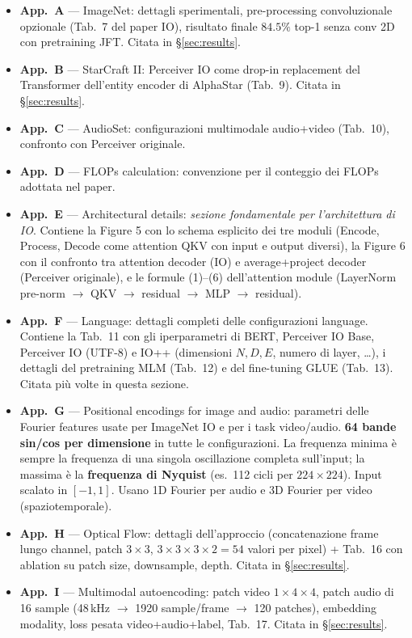 \documentclass[
  11pt,
]{article}
\begin{document}
\begin{notabox}[title={\textbf{Mappa delle appendici del paper Perceiver IO (Jaegle et al., 2022)}}]
\begin{itemize}\setlength\itemsep{0.1em}
\item \textbf{App.\ A} --- ImageNet: dettagli sperimentali, pre-processing convoluzionale opzionale (Tab.\ 7 del paper IO), risultato finale $84.5\%$ top-1 senza conv 2D con pretraining JFT. Citata in \S\ref{sec:results}.
\item \textbf{App.\ B} --- StarCraft II: Perceiver IO come drop-in replacement del Transformer dell'entity encoder di AlphaStar (Tab.\ 9). Citata in \S\ref{sec:results}.
\item \textbf{App.\ C} --- AudioSet: configurazioni multimodale audio+video (Tab.\ 10), confronto con Perceiver originale.
\item \textbf{App.\ D} --- FLOPs calculation: convenzione per il conteggio dei FLOPs adottata nel paper.
\item \textbf{App.\ E} --- Architectural details: \emph{sezione fondamentale per l'architettura di IO}. Contiene la Figure 5 con lo schema esplicito dei tre moduli (Encode, Process, Decode come attention QKV con input e output diversi), la Figure 6 con il confronto tra attention decoder (IO) e average+project decoder (Perceiver originale), e le formule (1)--(6) dell'attention module (LayerNorm pre-norm $\to$ QKV $\to$ residual $\to$ MLP $\to$ residual).
\item \textbf{App.\ F} --- Language: dettagli completi delle configurazioni language. Contiene la Tab.\ 11 con gli iperparametri di BERT, Perceiver IO Base, Perceiver IO (UTF-8) e IO++ (dimensioni $N, D, E$, numero di layer, \ldots), i dettagli del pretraining MLM (Tab.\ 12) e del fine-tuning GLUE (Tab.\ 13). Citata più volte in questa sezione.
\item \textbf{App.\ G} --- Positional encodings for image and audio: parametri delle Fourier features usate per ImageNet IO e per i task video/audio. \textbf{64 bande sin/cos per dimensione} in tutte le configurazioni. La frequenza minima è sempre la frequenza di una singola oscillazione completa sull'input; la massima è la \textbf{frequenza di Nyquist} (es.\ 112 cicli per $224 \times 224$). Input scalato in $[-1, 1]$. Usano 1D Fourier per audio e 3D Fourier per video (spaziotemporale).
\item \textbf{App.\ H} --- Optical Flow: dettagli dell'approccio (concatenazione frame lungo channel, patch $3 \times 3$, $3 \times 3 \times 3 \times 2 = 54$ valori per pixel) + Tab.\ 16 con ablation su patch size, downsample, depth. Citata in \S\ref{sec:results}.
\item \textbf{App.\ I} --- Multimodal autoencoding: patch video $1 \times 4 \times 4$, patch audio di 16 sample (48\,kHz $\to$ 1920 sample/frame $\to$ 120 patches), embedding modality, loss pesata video+audio+label, Tab.\ 17. Citata in \S\ref{sec:results}.
\end{itemize}
\end{notabox}
\end{document}

